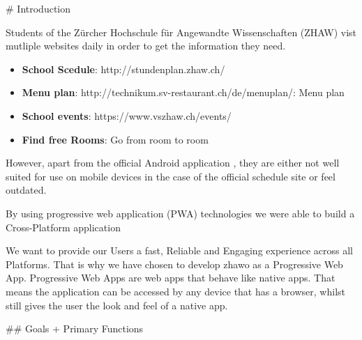 \begin{markdown}

# Introduction

Students of the Zürcher Hochschule für Angewandte Wissenschaften (ZHAW) vist mutliple websites daily in order to get the information they need.

\begin{itemize}
  \item \textbf{School Scedule}: http://stundenplan.zhaw.ch/
  \item \textbf{Menu plan}: http://technikum.sv-restaurant.ch/de/menuplan/: Menu plan
  \item \textbf{School events}: https://www.vszhaw.ch/events/
  \item \textbf{Find free Rooms}: Go from room to room
\end{itemize}


However, apart from the official Android application \cite{DUMMY}, they are either not well suited for use on mobile devices in the case of the official schedule site \cite{DUMMY} or feel outdated.



By using progressive web application (PWA) technologies \cite{OurReadme} we were able to build a Cross-Platform application

We want to provide our Users a fast, Reliable and Engaging experience across all Platforms. That is why we have chosen to develop zhawo as a Progressive Web App. Progressive Web Apps are web apps that behave like native apps. That means the application can be accessed by any device that has a browser, whilst still gives the user the look and feel of a native app.



## Goals + Primary Functions


\end{markdown}
